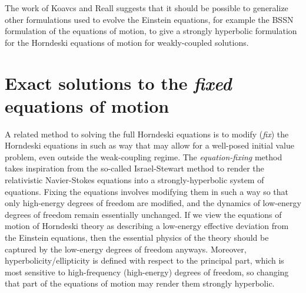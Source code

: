 \documentclass{ws-ijmpd}
\begin{document}
The work of Koavcs and Reall suggests that it should be possible
to generalize other formulations used to evolve the Einstein
equations, for example the BSSN formulation of the equations of 
motion\cite{Shibata:1995we,Baumgarte:1998te},
to give a strongly hyperbolic formulation for the
Horndeski equations of motion for weakly-coupled solutions.

\section{Exact solutions to the \emph{fixed}
equations of motion\label{sec:fixing_eqns}}

A related method to solving the full Horndeski equations is to
modify (\emph{fix}) the Horndeski equations in such as way that may allow
for a well-posed initial value problem, even outside the 
weak-coupling regime.
The \emph{equation-fixing} method takes inspiration from the so-called
Israel-Stewart method\cite{Israel:1976tn,1976PhLA...58..213I,Israel:1979wp} 
to render the relativistic Navier-Stokes
equations into a strongly-hyperbolic system of 
equations\cite{Cayuso:2017iqc,Allwright:2018rut}.
Fixing the equations involves modifying them in such a
way so that only high-energy degrees of freedom are modified, 
and the dynamics of
low-energy degrees of freedom remain essentially unchanged.
If we view the equations of motion of Horndeski theory as describing
a low-energy effective deviation from the Einstein equations,
then the essential physics of the theory should be captured
by the low-energy degrees of freedom anyways.
Moreover, hyperbolicity/ellipticity is defined with respect
to the principal part, which is most sensitive to high-frequency
(high-energy) degrees of freedom, so changing that part of the
equations of motion may render them strongly hyperbolic.
\end{document}
